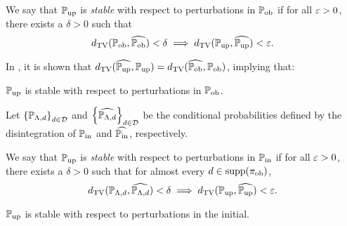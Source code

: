 \begin{frame}[t]

\begin{defn}\label{defn:stableobs}
	We say that $\operatorname*{\mathbb{P}_{up}}$ is \emph{stable} with respect to perturbations in $\operatorname*{\mathbb{P}_{ob}}$ if for all $\varepsilon > 0$, there exists a $\delta > 0$ such that
	\begin{equation}
		d_{\text{TV}} (\operatorname*{\mathbb{P}_{ob}}, \widehat{\operatorname*{\mathbb{P}_{ob}}}) < \delta \implies d_{\text{TV}} (\operatorname*{\mathbb{P}_{up}}, \widehat{\operatorname*{\mathbb{P}_{up}}}) < \varepsilon.
	\end{equation}
\end{defn}

\vspace{0.5in}
In \cite{BJW18}, it is shown that $d_{\text{TV}} (\widehat{\operatorname*{\mathbb{P}_{up}}}, \operatorname*{\mathbb{P}_{up}}) = d_{\text{TV}} (\widehat{\operatorname*{\mathbb{P}_{ob}}}, \operatorname*{\mathbb{P}_{ob}})$, implying that:
\vspace{0.5in}

\begin{theorem}
	$\operatorname*{\mathbb{P}_{up}}$ is stable with respect to perturbations in $\operatorname*{\mathbb{P}_{ob}}$.
\end{theorem}

\end{frame}

\begin{frame}[t]
\begin{defn}\label{defn:stableinitial}
Let $\left\{\mathbb{P}_{{\Lambda}, d}\right\}_{d\in\mathcal{D}}^{}$ and $\left\{\widehat{\mathbb{P}_{{\Lambda}, d}}\right\}_{d\in\mathcal{D}}^{}$ be the conditional probabilities defined by the disintegration of $\operatorname*{\mathbb{P}_{in}}$ and $\widehat{\operatorname*{\mathbb{P}_{in}}}$, respectively.

We say that $\operatorname*{\mathbb{P}_{up}}$ is \emph{stable} with respect to perturbations in $\operatorname*{\mathbb{P}_{in}}$ if for all $\varepsilon > 0$, there exists a $\delta > 0$ such that for almost every $d\in\text{supp}(\operatorname*{\pi_{ob}})$,
\begin{equation}\label{eq:stableinitial}
d_{\text{TV}} (\mathbb{P}_{{\Lambda}, d}, \widehat{\mathbb{P}_{{\Lambda}, d}}) < \delta \implies d_{\text{TV}} (\operatorname*{\mathbb{P}_{up}}, \widehat{\operatorname*{\mathbb{P}_{up}}}) < \varepsilon.
\end{equation}
\end{defn}

\begin{theorem}
$\operatorname*{\mathbb{P}_{up}}$ is stable with respect to perturbations in the initial.
\label{thm:stableinitial}
\end{theorem}


\end{frame}

